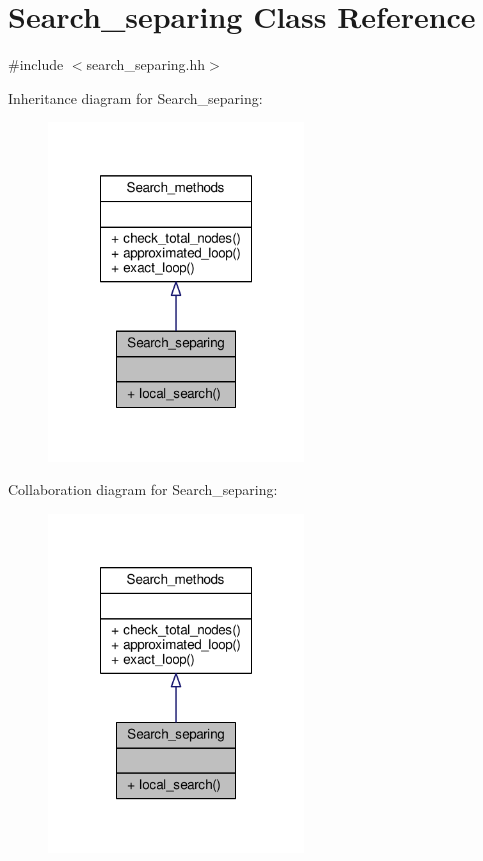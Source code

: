 \hypertarget{classSearch__separing}{\section{Search\-\_\-separing Class Reference}
\label{classSearch__separing}
}


{\ttfamily \#include $<$search\-\_\-separing.\-hh$>$}



Inheritance diagram for Search\-\_\-separing\-:\nopagebreak
\begin{figure}[H]
\begin{center}
\leavevmode
\includegraphics[width=192pt]{classSearch__separing__inherit__graph}
\end{center}
\end{figure}


Collaboration diagram for Search\-\_\-separing\-:\nopagebreak
\begin{figure}[H]
\begin{center}
\leavevmode
\includegraphics[width=192pt]{classSearch__separing__coll__graph}
\end{center}
\end{figure}
